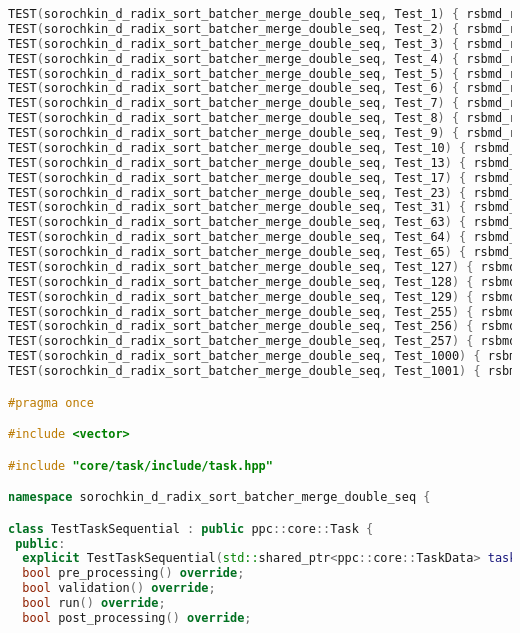 \documentclass[12pt]{article}
\begin{document}
\begin{lstlisting}[language=C++, caption={Код алгоритма}]
TEST(sorochkin_d_radix_sort_batcher_merge_double_seq, Test_1) { rsbmd_random_test(1); }
TEST(sorochkin_d_radix_sort_batcher_merge_double_seq, Test_2) { rsbmd_random_test(2); }
TEST(sorochkin_d_radix_sort_batcher_merge_double_seq, Test_3) { rsbmd_random_test(3); }
TEST(sorochkin_d_radix_sort_batcher_merge_double_seq, Test_4) { rsbmd_random_test(4); }
TEST(sorochkin_d_radix_sort_batcher_merge_double_seq, Test_5) { rsbmd_random_test(5); }
TEST(sorochkin_d_radix_sort_batcher_merge_double_seq, Test_6) { rsbmd_random_test(6); }
TEST(sorochkin_d_radix_sort_batcher_merge_double_seq, Test_7) { rsbmd_random_test(7); }
TEST(sorochkin_d_radix_sort_batcher_merge_double_seq, Test_8) { rsbmd_random_test(8); }
TEST(sorochkin_d_radix_sort_batcher_merge_double_seq, Test_9) { rsbmd_random_test(9); }
TEST(sorochkin_d_radix_sort_batcher_merge_double_seq, Test_10) { rsbmd_random_test(10); }
TEST(sorochkin_d_radix_sort_batcher_merge_double_seq, Test_13) { rsbmd_random_test(13); }
TEST(sorochkin_d_radix_sort_batcher_merge_double_seq, Test_17) { rsbmd_random_test(17); }
TEST(sorochkin_d_radix_sort_batcher_merge_double_seq, Test_23) { rsbmd_random_test(23); }
TEST(sorochkin_d_radix_sort_batcher_merge_double_seq, Test_31) { rsbmd_random_test(31); }
TEST(sorochkin_d_radix_sort_batcher_merge_double_seq, Test_63) { rsbmd_random_test(63); }
TEST(sorochkin_d_radix_sort_batcher_merge_double_seq, Test_64) { rsbmd_random_test(64); }
TEST(sorochkin_d_radix_sort_batcher_merge_double_seq, Test_65) { rsbmd_random_test(65); }
TEST(sorochkin_d_radix_sort_batcher_merge_double_seq, Test_127) { rsbmd_random_test(127); }
TEST(sorochkin_d_radix_sort_batcher_merge_double_seq, Test_128) { rsbmd_random_test(128); }
TEST(sorochkin_d_radix_sort_batcher_merge_double_seq, Test_129) { rsbmd_random_test(129); }
TEST(sorochkin_d_radix_sort_batcher_merge_double_seq, Test_255) { rsbmd_random_test(255); }
TEST(sorochkin_d_radix_sort_batcher_merge_double_seq, Test_256) { rsbmd_random_test(256); }
TEST(sorochkin_d_radix_sort_batcher_merge_double_seq, Test_257) { rsbmd_random_test(256); }
TEST(sorochkin_d_radix_sort_batcher_merge_double_seq, Test_1000) { rsbmd_random_test(1000); }
TEST(sorochkin_d_radix_sort_batcher_merge_double_seq, Test_1001) { rsbmd_random_test(1001); }

#pragma once

#include <vector>

#include "core/task/include/task.hpp"

namespace sorochkin_d_radix_sort_batcher_merge_double_seq {

class TestTaskSequential : public ppc::core::Task {
 public:
  explicit TestTaskSequential(std::shared_ptr<ppc::core::TaskData> taskData_) : Task(std::move(taskData_)) {}
  bool pre_processing() override;
  bool validation() override;
  bool run() override;
  bool post_processing() override;


\end{lstlisting}
\end{document}
